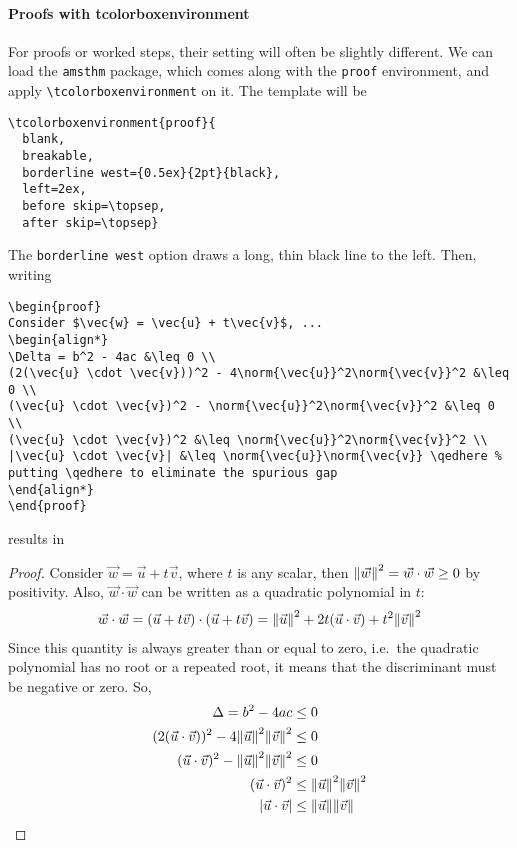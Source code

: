 \paragraph{Proofs with tcolorboxenvironment} For proofs or worked steps, their setting will often be slightly different. We can load the \texttt{amsthm} package, which comes along with the \texttt{proof} environment, and apply \texttt{\textbackslash tcolorboxenvironment} on it. The template will be
\begin{lstlisting}
\tcolorboxenvironment{proof}{
  blank,
  breakable,
  borderline west={0.5ex}{2pt}{black},
  left=2ex,
  before skip=\topsep,
  after skip=\topsep} 
\end{lstlisting}
The \texttt{borderline west} option draws a long, thin black line to the left. Then, writing
\begin{lstlisting}
\begin{proof}
Consider $\vec{w} = \vec{u} + t\vec{v}$, ...
\begin{align*}
\Delta = b^2 - 4ac &\leq 0 \\
(2(\vec{u} \cdot \vec{v}))^2 - 4\norm{\vec{u}}^2\norm{\vec{v}}^2 &\leq 0 \\
(\vec{u} \cdot \vec{v})^2 - \norm{\vec{u}}^2\norm{\vec{v}}^2 &\leq 0 \\
(\vec{u} \cdot \vec{v})^2 &\leq \norm{\vec{u}}^2\norm{\vec{v}}^2 \\
|\vec{u} \cdot \vec{v}| &\leq \norm{\vec{u}}\norm{\vec{v}} \qedhere % putting \qedhere to eliminate the spurious gap
\end{align*}
\end{proof}
\end{lstlisting}
results in
\begin{proof}
Consider $\vec{w} = \vec{u} + t\vec{v}$, where $t$ is any scalar, then $\norm{\vec{w}}^2 = \vec{w}\cdot\vec{w} \geq 0$ by positivity. Also, $\vec{w}\cdot\vec{w}$ can be written as a quadratic polynomial in $t$:
\begin{align*}
\vec{w}\cdot\vec{w} = (\vec{u} + t\vec{v}) \cdot (\vec{u} + t\vec{v}) = \norm{\vec{u}}^2 + 2t(\vec{u} \cdot \vec{v}) + t^2\norm{\vec{v}}^2
\end{align*}
Since this quantity is always greater than or equal to zero, i.e.\ the quadratic polynomial has no root or a repeated root, it means that the discriminant must be negative or zero. So,
\begin{align*}
\Delta = b^2 - 4ac &\leq 0 \\
(2(\vec{u} \cdot \vec{v}))^2 - 4\norm{\vec{u}}^2\norm{\vec{v}}^2 &\leq 0 \\
(\vec{u} \cdot \vec{v})^2 - \norm{\vec{u}}^2\norm{\vec{v}}^2 &\leq 0 \\
(\vec{u} \cdot \vec{v})^2 &\leq \norm{\vec{u}}^2\norm{\vec{v}}^2 \\
|\vec{u} \cdot \vec{v}| &\leq \norm{\vec{u}}\norm{\vec{v}} \qedhere
\end{align*}
\end{proof}
